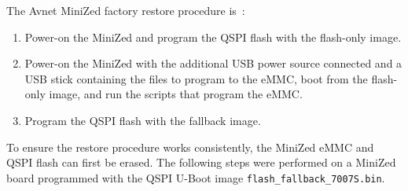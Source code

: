 The Avnet MiniZed factory restore procedure is~\cite{Avnet_MiniZed_Restore_2018}:
%
\begin{enumerate}
\item Power-on the MiniZed and program the QSPI flash with the flash-only image.
\item Power-on the MiniZed with the additional USB power source connected and
a USB stick containing the files to program to the eMMC, boot from the flash-only
image, and run the scripts that program the eMMC.
\item Program the QSPI flash with the fallback image.
\end{enumerate}
%
To ensure the restore procedure works consistently, the MiniZed eMMC and
QSPI flash can first be erased. The following steps were performed on a
MiniZed board programmed with the QSPI U-Boot image
\verb+flash_fallback_7007S.bin+.
%
